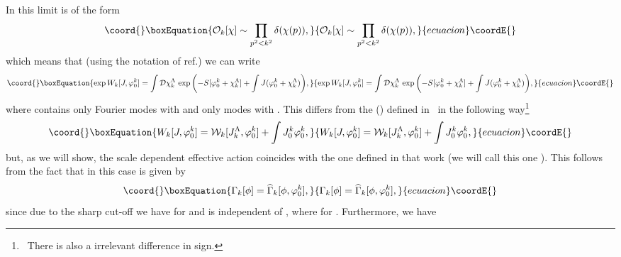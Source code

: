 \documentclass[a4paper,12pt]{article}
\begin{document}
In this limit \coordHE{} is of the form
\begin{equation}\coord{}\boxEquation{
               {\mathcal O}_k [\chi] \sim \prod_{p^2<k^2} \delta(\chi(p)),
}{
               {\mathcal O}_k [\chi] \sim \prod_{p^2<k^2} \delta(\chi(p)),
}{ecuacion}\coordE{}\end{equation}
which means that (using the notation of ref.\cite{Bra02}) we can write
\begin{equation}\coord{}\boxEquation{
               \exp{W_k[J,\varphi_0^k]}=\int{\mathcal D}\chi_k^{\Lambda}\,\exp{\left(-S[\varphi_0^k+\chi_k^{\Lambda}]+\int J(\varphi_0^k+\chi_k^{\Lambda})\right)},
}{
               \exp{W_k[J,\varphi_0^k]}=\int{\mathcal D}\chi_k^{\Lambda}\,\exp{\left(-S[\varphi_0^k+\chi_k^{\Lambda}]+\int J(\varphi_0^k+\chi_k^{\Lambda})\right)},
}{ecuacion}\coordE{}\end{equation}
where \coordHE{} contains only Fourier modes with \coordHE{} and \coordHE{} only modes with \coordHE{}. This differs from the \coordHE{} (\coordHE{}) defined in~\cite{Bra02} in the following way\footnote{~There is also a irrelevant difference in sign.}
\begin{equation}\coord{}\boxEquation{
               W_k [J,\varphi_0^k]=  {\mathcal W}_k [J_k^{\Lambda},\varphi_0^k] +\int J_0^k \varphi_0^k,
}{
               W_k [J,\varphi_0^k]=  {\mathcal W}_k [J_k^{\Lambda},\varphi_0^k] +\int J_0^k \varphi_0^k,
}{ecuacion}\coordE{}\end{equation}          
but, as we will show, the scale dependent effective action \coordHE{} coincides with the one defined in that work (we will call this one \coordHE{}). This follows from the fact that \coordHE{} in this case is given by
\begin{equation}\coord{}\boxEquation{
               \Gamma_k[\phi]=\widehat{\Gamma}_k[\phi,\varphi_0^k],
}{
               \Gamma_k[\phi]=\widehat{\Gamma}_k[\phi,\varphi_0^k],
}{ecuacion}\coordE{}\end{equation}
since due to the sharp cut-off we have \coordHE{} for \coordHE{} and \coordHE{} is independent of \coordHE{}, where \coordHE{} for \coordHE{}. Furthermore, we have
\end{document}
